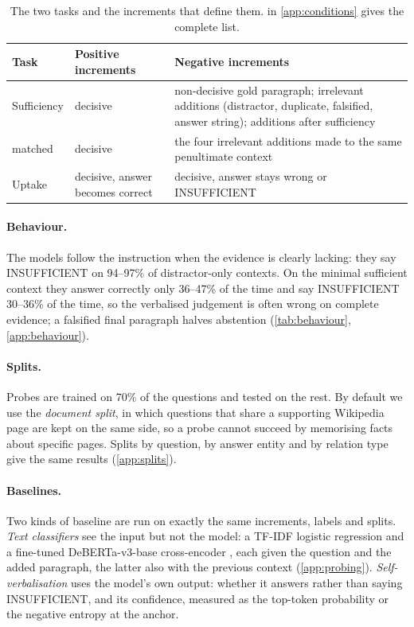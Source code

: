 \begin{table}[t]
\centering\footnotesize
\setlength{\tabcolsep}{3pt}
\begin{tabular}{@{}lp{1.7cm}p{3.55cm}@{}}
\toprule
Task & Positive increments & Negative increments \\
\midrule
Sufficiency & decisive & non-decisive gold paragraph; irrelevant additions (distractor, duplicate, falsified, answer string); additions after sufficiency \\
\;\;matched & decisive & the four irrelevant additions made to the same penultimate context \\
Uptake & decisive, answer becomes correct & decisive, answer stays wrong or INSUFFICIENT \\
\bottomrule
\end{tabular}
\caption{The two tasks and the increments that define them.  in \cref{app:conditions} gives the complete list.}
\label{tab:tasks}
\end{table}

\paragraph{Behaviour.}
The models follow the instruction when the evidence is clearly lacking: they say INSUFFICIENT on 94--97\% of distractor-only contexts. On the minimal sufficient context they answer correctly only 36--47\% of the time and say INSUFFICIENT 30--36\% of the time, so the verbalised judgement is often wrong on complete evidence; a falsified final paragraph halves abstention (\cref{tab:behaviour}, \cref{app:behaviour}).

\paragraph{Splits.}
Probes are trained on 70\% of the questions and tested on the rest. By default we use the \emph{document split}, in which questions that share a supporting Wikipedia page are kept on the same side, so a probe cannot succeed by memorising facts about specific pages. Splits by question, by answer entity and by relation type give the same results (\cref{app:splits}).

\paragraph{Baselines.}
Two kinds of baseline are run on exactly the same increments, labels and splits. \emph{Text classifiers} see the input but not the model: a TF-IDF logistic regression and a fine-tuned DeBERTa-v3-base cross-encoder \cite{he2023debertav3}, each given the question and the added paragraph, the latter also with the previous context (\cref{app:probing}). \emph{Self-verbalisation} uses the model's own output: whether it answers rather than saying INSUFFICIENT, and its confidence, measured as the top-token probability or the negative entropy at the anchor.
